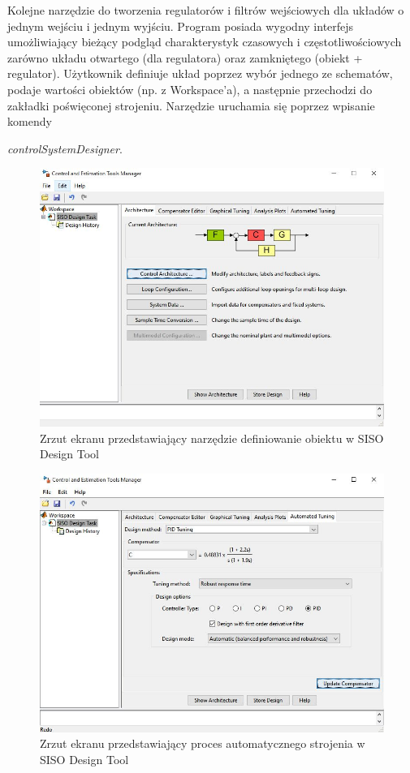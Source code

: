 Kolejne narzędzie do tworzenia regulatorów i filtrów wejściowych dla
układów o jednym wejściu i jednym wyjściu. Program posiada wygodny interfejs umożliwiający bieżący podgląd charakterystyk czasowych i częstotliwościowych
zarówno układu otwartego (dla regulatora) oraz zamkniętego (obiekt + regulator). Użytkownik definiuje układ poprzez wybór jednego ze schematów, podaje wartości obiektów (np. z Workspace'a), a następnie przechodzi do zakładki poświęconej strojeniu.
Narzędzie uruchamia się poprzez wpisanie komendy

\textit{controlSystemDesigner}.

\begin{figure}[H]
	\centering
	\includegraphics[width=130mm]{SISO_Design_Tool1}
	\caption{Zrzut ekranu przedstawiający narzędzie definiowanie obiektu w SISO Design Tool}
	\label{fig:SISO_Design_Tool1}
\end{figure}
\begin{figure}[H]
	\centering
	\includegraphics[width=130mm]{SISO_Design_Tool2}
	\caption{Zrzut ekranu przedstawiający proces automatycznego strojenia w SISO Design Tool}
	\label{fig:SISO_Design_Tool2}
\end{figure}



